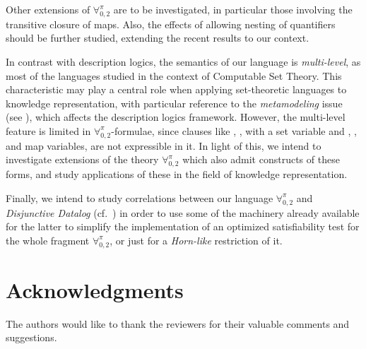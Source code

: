 \documentclass[submission,copyright,creativecommons]{eptcs}
\newcommand{\Lang}{\ensuremath{\mathbf{\forall}^{\pi}_{0,2}}\xspace}
\begin{document}
Other extensions of \Lang are to be investigated, in particular those
involving the transitive closure of maps.  Also, the effects of
allowing nesting of quantifiers should be further studied, extending 
the recent results \cite{OmoPol2010, OmoPol2012} to our context.

In contrast with description logics, the semantics of our language is
\emph{multi-level}, as most of the languages studied in the context of
Computable Set Theory. This characteristic may play
a central role when applying set-theoretic languages to knowledge
representation, with particular reference to the \emph{metamodeling} issue
(see \cite{WelFer1994, Mot2007}), which affects the description logics
framework.
However, the multi-level feature is limited in \Lang-formulae, since
clauses like , , 
with  a set variable and , , and  map
variables, are not expressible in it.
In light of this, we intend to investigate extensions of the theory
\Lang which also admit constructs of these forms, and study
applications of these in the field of knowledge representation.

Finally, we intend to study correlations between our language \Lang
and \emph{Disjunctive Datalog} (cf.\ \cite{EitGotMan1997}) in order to
use some of the machinery already available for the latter to
simplify the implementation of an optimized satisfiability test for
the whole fragment \Lang, or just for a \emph{Horn-like} restriction
of it.

\section*{Acknowledgments}
The authors would like to thank the reviewers for their valuable 
comments and suggestions.


\end{document}
